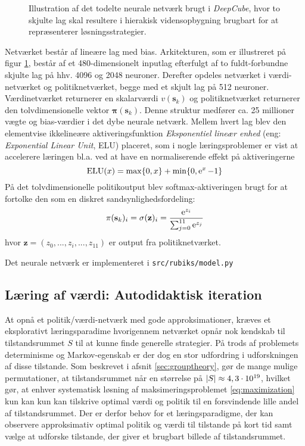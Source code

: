 \documentclass[../main.tex]{subfiles}
\begin{document}
\begin{figure}[H]
	\centering

\caption{Illustration af det todelte neurale netværk brugt i \textit{DeepCube}, hvor to skjulte lag skal resultere i hierakisk vidensopbygning brugbart for at repræsenterer løsningsstrategier.}
\label{fig:DNN}
\end{figure}
\noindent Netværket består af lineære lag med bias.  Arkitekturen, som er illustreret på figur \ref{fig:DNN}, består af et 480-dimensionelt inputlag efterfulgt af to fuldt-forbundne skjulte lag på hhv. 4096 og 2048 neuroner. Derefter opdeles netværket i værdi-netværket og politiknetværket, begge med et skjult lag på 512 neuroner. Værdinetværket returnerer en skalarværdi \(v(\mathbf s_k)\) og politiknetværket returnerer den tolvdimensionelle vektor \(\bm \pi (\mathbf s_k)\). Denne struktur medfører ca. 25 millioner vægte og bias-værdier i det dybe neurale netværk. Mellem hvert lag blev den elementvise ikkelineære aktiveringsfunktion \textit{Eksponentiel lineær enhed} (eng: \textit{Exponential Linear Unit}, ELU) placeret, som i nogle læringsproblemer er vist at accelerere læringen bl.a. ved at have en normaliserende effekt på aktiveringerne \cite{ELU} 
\[
\operatorname{ELU}(x) = \operatorname*{max}\{0, x\} + \operatorname{min}\{0, \operatorname{e}^{x} -1\}
\]
På det tolvdimensionelle politikoutput blev softmax-aktiveringen brugt for at fortolke den som en diskret sandsynlighedsfordeling:
\[
\pi(\mathbf s_k)_i = \sigma(\mathbf z)_i = \frac{\operatorname{e}^{z_i}}{\sum_{j=0}^{11} \operatorname{e}^{z_j}}
\]
hvor \(\mathbf z=(z_0, ..., z_i, ..., z_{11})\) er output fra politiknetværket.

Det neurale netværk er implementeret i \texttt{src/rubiks/model.py}

\subsection*{Læring af værdi: Autodidaktisk iteration}
At opnå et politik/værdi-netværk med gode approksimationer, kræves et eksplorativt læringsparadime hvorigennem netværket opnår nok kendskab til tilstandsrummet \(S\) til at kunne finde generelle strategier. 
På trods af problemets determinisme og Markov-egenskab er der dog en stor udfordring i udforskningen af disse tilstande.
Som beskrevet i afsnit \ref{sec:grouptheory}, gør de mange mulige permutationer, at tilstandsrummet når en størrelse på \(|S|\approx 4,3\cdot10^{19}\), hvilket gør, at enhver systematisk løsning af maksimeringsproblemet \ref{eq:maximization} kun kan kun kan tilskrive optimal værdi og politik til en forsvindende lille andel af tilstandsrummet.
Der er derfor behov for et læringsparadigme, der kan observere approksimativ optimal politik og værdi til tilstande på kort tid samt vælge at udforske tilstande, der giver et brugbart billede af tilstandsrummet.
\end{document}
